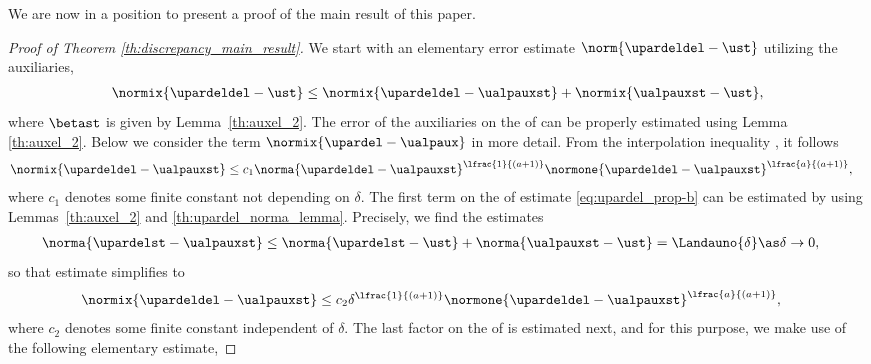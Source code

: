 \documentclass[10pt]{article}
\theoremstyle{definition}
\begin{document}
%
We are now in a position to present a proof of the main result of this paper.
%
\begin{proof}[Proof of Theorem \ref{th:discrepancy_main_result}]
We start with an elementary error estimate $ \norm{\upardeldel -\ust} $
utilizing the auxiliaries,
%
\begin{align}
\normix{\upardeldel -\ust}\le
\normix{\upardeldel -\ualpauxst}+\normix{\ualpauxst-\ust},
\label{eq:upardel_prop-a}
\end{align}
%
where $ \betast $ is given by
Lemma~\ref{th:auxel_2}.
The error of the auxiliaries
on the \rhs of 
can be properly estimated using Lemma \ref{th:auxel_2}.
Below we consider the term $ \normix{\upardel -\ualpaux} $ in more detail.
From the interpolation inequality ,
it follows
%
\begin{align}
\label{eq:upardel_prop-b}
\normix{\upardeldel -\ualpauxst} & \le
c_1 \norma{\upardeldel -\ualpauxst}^{\lfrac{1}{(a+1)}}
\normone{\upardeldel -\ualpauxst}^{\lfrac{a}{(a+1)}},
\end{align}
%
where $ c_1 $ denotes some finite constant not depending on $ \delta $.
The first term on the \rhs of estimate \eqref{eq:upardel_prop-b}
can be estimated by using
Lemmas~\ref{th:auxel_2} and
\ref{th:upardel_norma_lemma}.
Precisely, we find
%
the estimates
%
\begin{align*}
\norma{\upardelst -\ualpauxst}
& \le
\norma{\upardelst -\ust} + \norma{\ualpauxst - \ust}
= \Landauno{\delta} \as \delta \to 0,
\end{align*}
%
so that estimate  simplifies to
%
\begin{align}
\label{eq:upardel_prop-c}
\normix{\upardeldel -\ualpauxst} & \le
c_2 \delta^{\lfrac{1}{(a+1)}}
\normone{\upardeldel -\ualpauxst}^{\lfrac{a}{(a+1)}},
\end{align}
%
where $ c_2 $ denotes some finite constant independent of $ \delta $.
The last factor on the \rhs of  is estimated next, and for this purpose, we make use of the following elementary estimate,

\end{proof}
\end{document}
